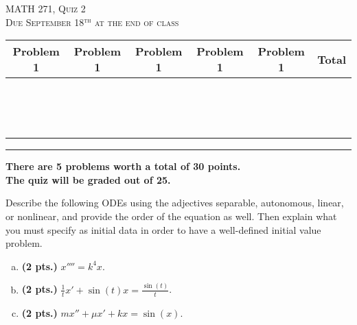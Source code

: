 \documentclass[12pt]{amsbook}
\begin{document}


\begin{center}
   \textsc{\large MATH 271, Quiz 2}\\
   \textsc{Due September 18$^\textrm{th}$ at the end of class}
\end{center}

\vspace{1cm}


\vspace{1cm}

\begin{center}
\begin{tabular}{|c|c|c|c|c||c|}
\hline
    \textrm{Problem 1} & \textrm{Problem 1} & \textrm{Problem 1} & \textrm{Problem 1} &\textrm{Problem 1} & \textrm{Total}\\
\hline
~ & ~ & ~ & ~ & ~ & ~\\
~ & ~ & ~ & ~ & ~ & ~\\
~ & ~ & ~ & ~ & ~ & ~\\
\hline
\end{tabular}
\end{center}

\vspace{1cm}


\begin{center}\end{center}


\vspace*{.5cm}
\hrule
\vspace*{.5cm}

\noindent \textbf{\large There are 5 problems worth a total of 30 points.}\\
\noindent \textbf{\large The quiz will be graded out of 25.}

\normalsize

\begin{problem}
Describe the following ODEs using the adjectives separable, autonomous, linear, or nonlinear, and provide the order of the equation as well. Then explain what you must specify as initial data in order to have a well-defined initial value problem.
\begin{enumerate}[(a)]
	\item \textbf{(2 pts.)} $x'''' = k^4 x$.
	\item \textbf{(2 pts.)} $\frac{1}{t} x' + \sin(t) x = \frac{\sin(t)}{t}$.
	\item \textbf{(2 pts.)} $mx''+\mu x' + kx = \sin(x)$.
\end{enumerate}
\end{problem}
\end{document}
